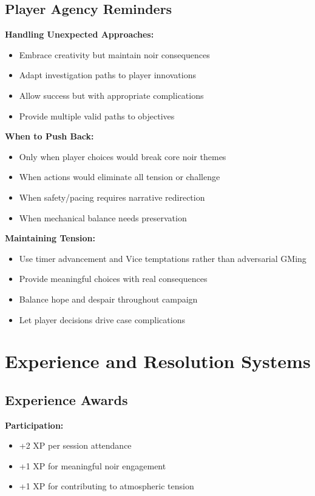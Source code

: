 \documentclass[11pt]{article}
\begin{document}
\subsection{Player Agency Reminders}

\textbf{Handling Unexpected Approaches:}
\begin{itemize}
\item Embrace creativity but maintain noir consequences
\item Adapt investigation paths to player innovations
\item Allow success but with appropriate complications
\item Provide multiple valid paths to objectives
\end{itemize}

\textbf{When to Push Back:}
\begin{itemize}
\item Only when player choices would break core noir themes
\item When actions would eliminate all tension or challenge
\item When safety/pacing requires narrative redirection
\item When mechanical balance needs preservation
\end{itemize}

\textbf{Maintaining Tension:}
\begin{itemize}
\item Use timer advancement and Vice temptations rather than adversarial GMing
\item Provide meaningful choices with real consequences
\item Balance hope and despair throughout campaign
\item Let player decisions drive case complications
\end{itemize}

\section{Experience and Resolution Systems}

\subsection{Experience Awards}

\textbf{Participation:}
\begin{itemize}
\item +2 XP per session attendance
\item +1 XP for meaningful noir engagement
\item +1 XP for contributing to atmospheric tension
\end{itemize}
\end{document}
